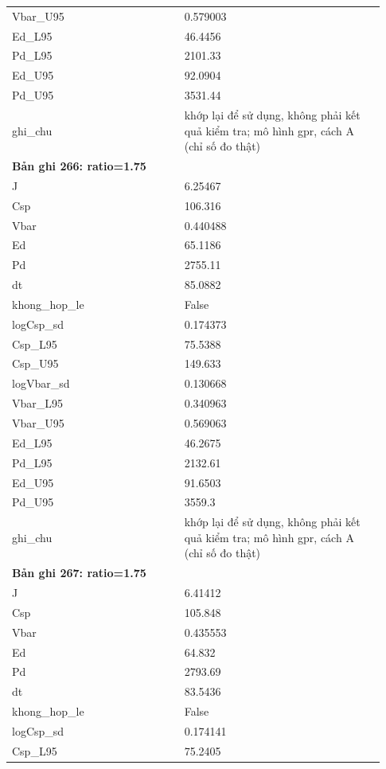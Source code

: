 \begin{longtable}{p{0.43\linewidth}p{0.50\linewidth}}
Vbar\_\allowbreak U95 & 0.579003 \\
Ed\_\allowbreak L95 & 46.4456 \\
Pd\_\allowbreak L95 & 2101.33 \\
Ed\_\allowbreak U95 & 92.0904 \\
Pd\_\allowbreak U95 & 3531.44 \\
ghi\_\allowbreak chu & khớp lại để sử dụng, không phải kết quả kiểm tra; mô hình gpr, cách A (chỉ số đo thật) \\
\midrule
\multicolumn{2}{p{0.95\linewidth}}{\textbf{Bản ghi 266: ratio=1.75}} \\
J & 6.25467 \\
Csp & 106.316 \\
Vbar & 0.440488 \\
Ed & 65.1186 \\
Pd & 2755.11 \\
dt & 85.0882 \\
khong\_\allowbreak hop\_\allowbreak le & False \\
logCsp\_\allowbreak sd & 0.174373 \\
Csp\_\allowbreak L95 & 75.5388 \\
Csp\_\allowbreak U95 & 149.633 \\
logVbar\_\allowbreak sd & 0.130668 \\
Vbar\_\allowbreak L95 & 0.340963 \\
Vbar\_\allowbreak U95 & 0.569063 \\
Ed\_\allowbreak L95 & 46.2675 \\
Pd\_\allowbreak L95 & 2132.61 \\
Ed\_\allowbreak U95 & 91.6503 \\
Pd\_\allowbreak U95 & 3559.3 \\
ghi\_\allowbreak chu & khớp lại để sử dụng, không phải kết quả kiểm tra; mô hình gpr, cách A (chỉ số đo thật) \\
\midrule
\multicolumn{2}{p{0.95\linewidth}}{\textbf{Bản ghi 267: ratio=1.75}} \\
J & 6.41412 \\
Csp & 105.848 \\
Vbar & 0.435553 \\
Ed & 64.832 \\
Pd & 2793.69 \\
dt & 83.5436 \\
khong\_\allowbreak hop\_\allowbreak le & False \\
logCsp\_\allowbreak sd & 0.174141 \\
Csp\_\allowbreak L95 & 75.2405 \\

\end{longtable}
